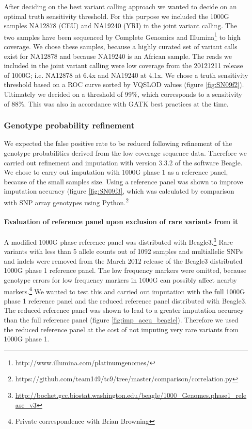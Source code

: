 After deciding on the best variant calling approach we wanted to decide on an optimal truth sensitivity threshold. For this purpose we included the 1000G samples NA12878 (\gls{CEU}) and NA19240 (\gls{YRI}) in the joint variant calling. The two samples have been sequenced by Complete Genomics\cite{Drmanac01012010} and Illumina\footnote{http://www.illumina.com/platinumgenomes/} to high coverage. We chose these samples, because a highly curated set of variant calls exist for NA12878\cite{Zook2014} and because NA19240 is an African sample. The reads we included in the joint variant calling were low coverage from the 20121211 release of 1000G; i.e. NA12878 at 6.4x and NA19240 at 4.1x. We chose a truth sensitivity threshold based on a \gls{ROC} curve sorted by \gls{VQSLOD} values (figure \ref{fig:SN09f2}). Ultimately we decided on a threshold of 99\%, which corresponds to a sensitivity of 88\%. This was also in accordance with \gls{GATK} best practices at the time.


\subsubsection{Genotype probability refinement}
\label{subsec:AGVrefinement}
We expected the false positive rate to be reduced following refinement of the genotype probabilities derived from the low coverage sequence data. Therefore we carried out refinement and imputation with version 3.3.2 of the software Beagle.\cite{Browning20071084} We chose to carry out imputation with \gls{1000G} phase 1 as a reference panel, because of the small samples size. Using a reference panel was shown to improve imputation accuracy (figure \ref{fig:SN09f3}, which was calculated by comparison with SNP array genotypes using Python.\footnote{https://github.com/team149/tc9/tree/master/comparison/correlation.py}


\paragraph{Evaluation of reference panel upon exclusion of rare variants from it}
A modified 1000G phase reference panel was distributed with Beagle3.\footnote{\url{http://bochet.gcc.biostat.washington.edu/beagle/1000_Genomes.phase1_release_v3}} Rare variants with less than 5 allele counts out of 1092 samples and multiallelic SNPs and indels were removed from the March 2012 release of the Beagle3 distributed 1000G phase 1 reference panel. The low frequency markers were omitted, because genotype errors for low frequency markers in 1000G can possibly affect nearby markers.\footnote{Private correspondence with Brian Browning} We wanted to test this and carried out imputation with the full 1000G phase 1 reference panel and the reduced reference panel distributed with Beagle3. The reduced reference panel was shown to lead to a greater imputation accuracy than the full reference panel (figure \ref{fig:imp_accu_beagle}). Therefore we used the reduced reference panel at the cost of not imputing very rare variants from 1000G phase 1.


